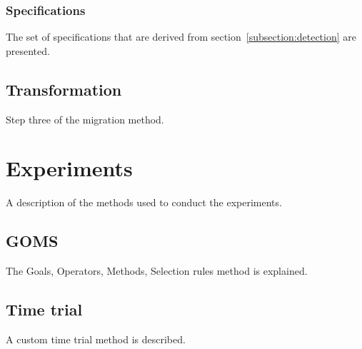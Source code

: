 \subsubsection{Specifications}
\label{subsubsection:specifications}
The set of specifications that are derived from section~\ref{subsection:detection} are presented.

\subsection{Transformation}
\label{subsection:transformation}
Step three of the migration method.

\section{Experiments}
\label{section:experiments_methods}
A description of the methods used to conduct the experiments.

\subsection{GOMS}
\label{subsection:goms_methods}
The Goals, Operators, Methods, Selection rules method is explained.

\subsection{Time trial}
\label{subsection:timetrial_methods}
A custom time trial method is described.